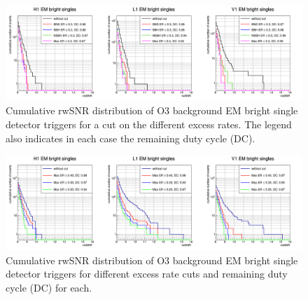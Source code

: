 \begin{figure}
  \centering
  \includegraphics[width=\linewidth]{sectionSelection/plotsEMbright/cCumER.png}
  \caption{Cumulative rwSNR distribution of O3 background EM bright single detector triggers for a cut on the different excess rates. The legend also indicates in each case the remaining duty cycle (DC).}
  \label{fig:cut_erw_embright}
\end{figure}


\begin{figure}
  \centering
  \includegraphics[width=\linewidth]{sectionSelection/plotsEMbright/cCumulERcut.png}
  \caption{Cumulative rwSNR distribution of O3 background EM bright single detector triggers for different excess rate cuts and remaining duty cycle (DC) for each.}
  \label{fig:embright_ercut}
\end{figure}



